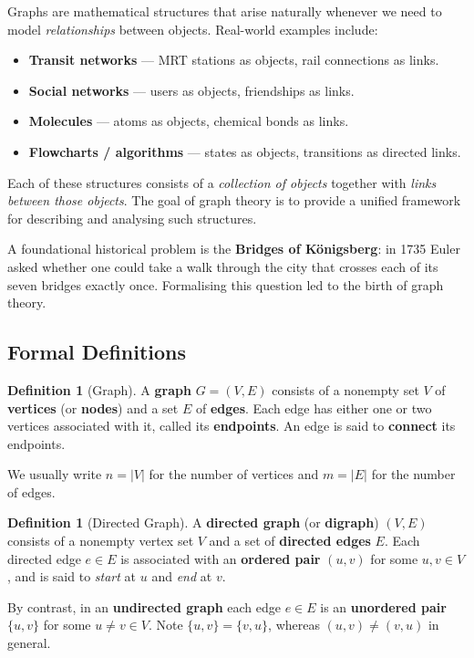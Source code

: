 \documentclass[11pt, a4paper, notitlepage]{report}
\theoremstyle{definition}
\newtheorem{definition}[theorem]{Definition}
\theoremstyle{remark}
\begin{document}
Graphs are mathematical structures that arise naturally whenever we need to model
\emph{relationships} between objects. Real-world examples include:
\begin{itemize}
  \item \textbf{Transit networks} — MRT stations as objects, rail connections as links.
  \item \textbf{Social networks} — users as objects, friendships as links.
  \item \textbf{Molecules} — atoms as objects, chemical bonds as links.
  \item \textbf{Flowcharts / algorithms} — states as objects, transitions as directed links.
\end{itemize}

Each of these structures consists of a \emph{collection of objects} together with \emph{links
between those objects}. The goal of graph theory is to provide a unified framework for
describing and analysing such structures.

A foundational historical problem is the \textbf{Bridges of K\"{o}nigsberg}: in 1735 Euler
asked whether one could take a walk through the city that crosses each of its seven bridges
exactly once. Formalising this question led to the birth of graph theory.

\subsection{Formal Definitions}
\label{subsec:graph-definitions}

\begin{definition}[Graph]
\label{def:graph}
A \textbf{graph} $G = (V, E)$ consists of a nonempty set $V$ of \textbf{vertices} (or
\textbf{nodes}) and a set $E$ of \textbf{edges}. Each edge has either one or two vertices
associated with it, called its \textbf{endpoints}. An edge is said to \textbf{connect} its
endpoints.
\end{definition}

We usually write $n = |V|$ for the number of vertices and $m = |E|$ for the number of edges.

\begin{definition}[Directed Graph]
\label{def:digraph}
A \textbf{directed graph} (or \textbf{digraph}) $(V, E)$ consists of a nonempty vertex set
$V$ and a set of \textbf{directed edges} $E$. Each directed edge $e \in E$ is associated with
an \textbf{ordered pair} $(u, v)$ for some $u, v \in V$, and is said to \emph{start} at $u$
and \emph{end} at $v$.

By contrast, in an \textbf{undirected graph} each edge $e \in E$ is an \textbf{unordered
pair} $\{u, v\}$ for some $u \neq v \in V$. Note $\{u,v\} = \{v,u\}$, whereas
$(u,v) \neq (v,u)$ in general.
\end{definition}
\end{document}
